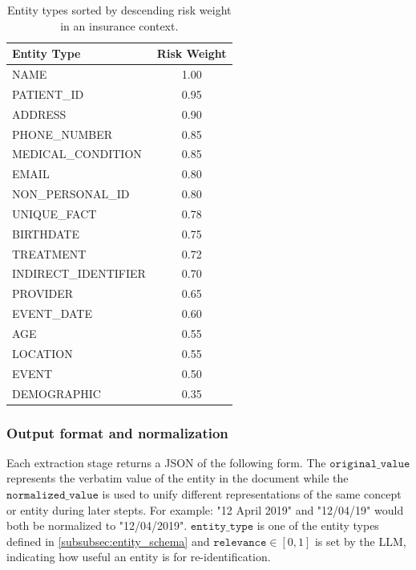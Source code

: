 \begin{table}[h!] 
    \centering
    \begin{tabular}{lc}
        \toprule
        \textbf{Entity Type} & \textbf{Risk Weight} \\
        \midrule
        NAME                 & 1.00 \\
        PATIENT\_ID          & 0.95 \\
        ADDRESS              & 0.90 \\
        PHONE\_NUMBER        & 0.85 \\
        MEDICAL\_CONDITION   & 0.85 \\
        EMAIL                & 0.80 \\
        NON\_PERSONAL\_ID    & 0.80 \\
        UNIQUE\_FACT         & 0.78 \\
        BIRTHDATE            & 0.75 \\
        TREATMENT            & 0.72 \\
        INDIRECT\_IDENTIFIER & 0.70 \\
        PROVIDER             & 0.65 \\
        EVENT\_DATE          & 0.60 \\
        AGE                  & 0.55 \\
        LOCATION             & 0.55 \\
        EVENT                & 0.50 \\
        DEMOGRAPHIC          & 0.35 \\
        \bottomrule
    \end{tabular}
    \caption{Entity types sorted by descending risk weight in an insurance context.}
    \label{tab:entity-weight-schema}
\end{table}

\subsubsection{Output format and normalization}
Each extraction stage returns a JSON of the following form. The $\texttt{original\_value}$ represents the verbatim value of the entity in the document while the $\texttt{normalized\_value}$ is used to unify different representations of the same concept or entity during later stepts. For example: "12 April 2019" and "12/04/19" would both be normalized to "12/04/2019". $\texttt{entity\_type}$ is one of the entity types defined in \ref{subsubsec:entity_schema} and $\texttt{relevance}\in[0,1]$ is set by the LLM, indicating how useful an entity is for re-identification.

